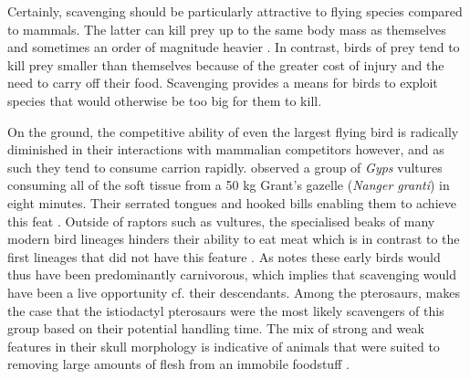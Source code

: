 \documentclass[a4paper,12pt]{article}
\begin{document}

Certainly, scavenging should be particularly attractive to flying species compared to mammals. %
The latter can kill prey up to the same body mass as themselves and sometimes an order of magnitude heavier \citep[e.g. socially hunting lions; ][]{owen2008predator}.
In contrast, birds of prey tend to kill prey smaller than themselves \citep{slagsvold2007prey} because of the greater cost of injury and the need to carry off their food.
Scavenging provides a means for birds to exploit species that would otherwise be too big for them to kill.

On the ground, the competitive ability of even the largest flying bird is radically diminished in their interactions with mammalian competitors however, and as such they tend to consume carrion rapidly. %
\cite{houston1974role} observed a group of \textit{Gyps} vultures consuming all of the soft tissue from a 50 kg Grant’s gazelle (\textit{Nanger granti}) in eight minutes. 
Their serrated tongues and hooked bills enabling them to achieve this feat \citep{houston1975digestive}. 
Outside of raptors such as vultures, the specialised beaks of many modern bird lineages hinders their ability to eat meat which is in contrast to the first lineages that did not have this feature \citep{martyniuk2012field}. 
As \cite{martyniuk2012field} notes these early birds would thus have been predominantly carnivorous, which implies that scavenging would have been a live opportunity cf. their descendants. 
Among the pterosaurs, \cite{witton2013pterosaurs} makes the case that the istiodactyl pterosaurs were the most likely scavengers of this group based on their potential handling time. 
The mix of strong and weak features in their skull morphology is indicative of animals that were suited to removing large amounts of flesh from an immobile foodstuff \citep{witton2013pterosaurs}. 
\end{document}
